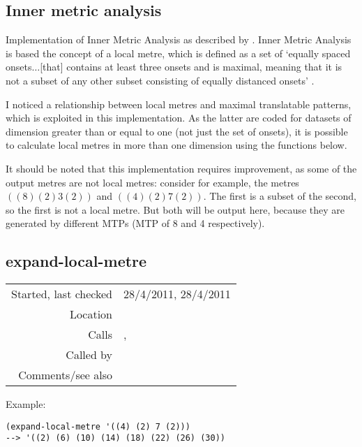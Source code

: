 \subsection{Inner metric analysis}\label{sec:inner-metric-analysis}

Implementation of Inner Metric Analysis as
described by \citet{volk2008}. Inner Metric Analysis is
based the concept of a local metre, which is defined as
a set of `equally spaced onsets$\ldots$[that] contains
at least three onsets and is maximal, meaning that it is
not a subset of any other subset consisting of equally
distanced onsets' \citep[][p.~261]{volk2008}.

I noticed a relationship between local metres and
maximal translatable patterns, which is exploited in
this implementation. As the latter are coded for
datasets of dimension greater than or equal to one (not
just the set of onsets), it is possible to calculate
local metres in more than one dimension using the
functions below.

It should be noted that this implementation requires
improvement, as some of the output metres are not local
metres: consider for example, the metres
$((8) (2) 3 (2))$ and $((4) (2) 7 (2))$. The first is a
subset of the second, so the first is not a local metre.
But both will be output here, because they are
generated by different MTPs (MTP of 8 and 4
respectively).


\subsection*{expand-local-metre}\label{fun:expand-local-metre}

\vspace{0.3cm}
\begin{tabular}{r|p{8cm}}
Started, last checked & 28/4/2011, 28/4/2011 \\
Location & \nameref{sec:inner-metric-analysis} \\
Calls & \nameref{fun:add-two-lists}, \nameref{fun:multiply-list-by-constant} \\
Called by & \nameref{fun:general-metric-weights} \\
Comments/see also & 
\end{tabular}

\vspace{0.5cm}
\noindent Example:
\begin{verbatim}
(expand-local-metre '((4) (2) 7 (2)))
--> '((2) (6) (10) (14) (18) (22) (26) (30))
\end{verbatim}

